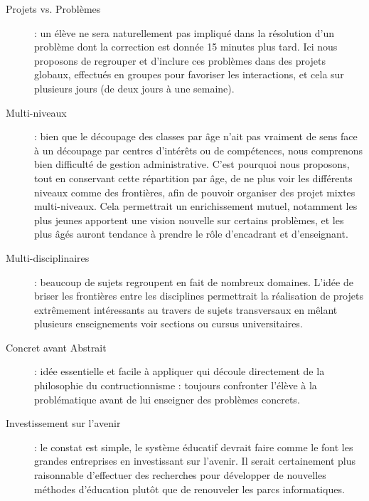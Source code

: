 \begin{description}
  \item[Projets vs. Problèmes] : un élève ne sera naturellement pas impliqué dans la résolution d'un problème dont la correction est donnée 15 minutes plus tard. Ici nous proposons de regrouper et d'inclure ces problèmes dans des projets globaux, effectués en groupes pour favoriser les interactions, et cela sur plusieurs jours (de deux jours à une semaine).
  \item[Multi-niveaux] : bien que le découpage des classes par âge n'ait pas vraiment de sens face à un découpage par centres d'intérêts ou de compétences, nous comprenons bien difficulté de gestion administrative. C'est pourquoi nous proposons, tout en conservant cette répartition par âge, de ne plus voir les différents niveaux comme des frontières, afin de pouvoir organiser des projet mixtes multi-niveaux. Cela permettrait un enrichissement mutuel, notamment les plus jeunes apportent une vision nouvelle sur certains problèmes, et les plus âgés auront tendance à prendre le rôle d'encadrant et d'enseignant.
  \item[Multi-disciplinaires] : beaucoup de sujets regroupent en fait de nombreux domaines. L'idée de briser les frontières entre les disciplines permettrait la réalisation de projets extrêmement intéressants au travers de sujets transversaux en mêlant plusieurs enseignements voir sections ou cursus universitaires.
  \item[Concret avant Abstrait] : idée essentielle et facile à appliquer qui découle directement de la philosophie du contructionnisme : toujours confronter l'élève à la problématique avant de lui enseigner des problèmes concrets.
  \item[Investissement sur l'avenir] : le constat est simple, le système éducatif devrait faire comme le font les grandes entreprises en investissant sur l'avenir. Il serait certainement plus raisonnable d'effectuer des recherches pour développer de nouvelles méthodes d'éducation plutôt que de renouveler les parcs informatiques.
\end{description}